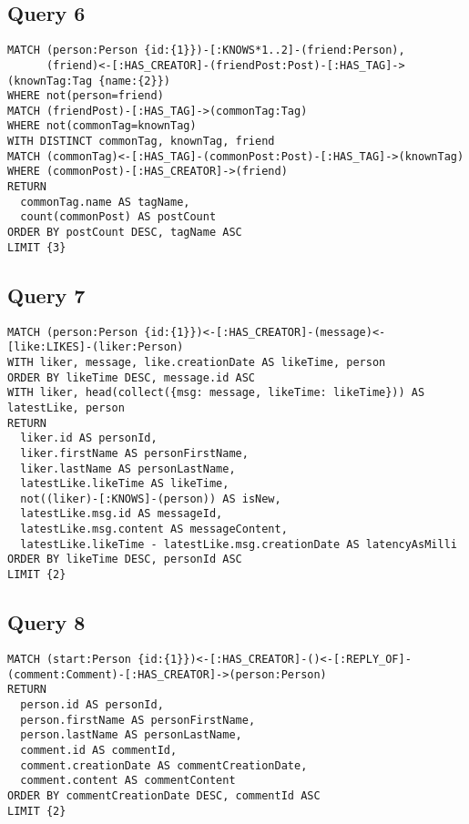 \subsection{Query 6}

{\footnotesize
\begin{verbatim}
MATCH (person:Person {id:{1}})-[:KNOWS*1..2]-(friend:Person),
      (friend)<-[:HAS_CREATOR]-(friendPost:Post)-[:HAS_TAG]->(knownTag:Tag {name:{2}})
WHERE not(person=friend)
MATCH (friendPost)-[:HAS_TAG]->(commonTag:Tag)
WHERE not(commonTag=knownTag)
WITH DISTINCT commonTag, knownTag, friend
MATCH (commonTag)<-[:HAS_TAG]-(commonPost:Post)-[:HAS_TAG]->(knownTag)
WHERE (commonPost)-[:HAS_CREATOR]->(friend)
RETURN 
  commonTag.name AS tagName, 
  count(commonPost) AS postCount
ORDER BY postCount DESC, tagName ASC
LIMIT {3}
\end{verbatim}
}

\subsection{Query 7}

{\footnotesize
\begin{verbatim}
MATCH (person:Person {id:{1}})<-[:HAS_CREATOR]-(message)<-[like:LIKES]-(liker:Person)
WITH liker, message, like.creationDate AS likeTime, person
ORDER BY likeTime DESC, message.id ASC
WITH liker, head(collect({msg: message, likeTime: likeTime})) AS latestLike, person
RETURN 
  liker.id AS personId, 
  liker.firstName AS personFirstName, 
  liker.lastName AS personLastName, 
  latestLike.likeTime AS likeTime, 
  not((liker)-[:KNOWS]-(person)) AS isNew, 
  latestLike.msg.id AS messageId, 
  latestLike.msg.content AS messageContent, 
  latestLike.likeTime - latestLike.msg.creationDate AS latencyAsMilli
ORDER BY likeTime DESC, personId ASC
LIMIT {2}
\end{verbatim}
}

\subsection{Query 8}

{\footnotesize
\begin{verbatim}
MATCH (start:Person {id:{1}})<-[:HAS_CREATOR]-()<-[:REPLY_OF]-(comment:Comment)-[:HAS_CREATOR]->(person:Person)
RETURN 
  person.id AS personId, 
  person.firstName AS personFirstName, 
  person.lastName AS personLastName, 
  comment.id AS commentId, 
  comment.creationDate AS commentCreationDate, 
  comment.content AS commentContent
ORDER BY commentCreationDate DESC, commentId ASC
LIMIT {2}
\end{verbatim}
}

